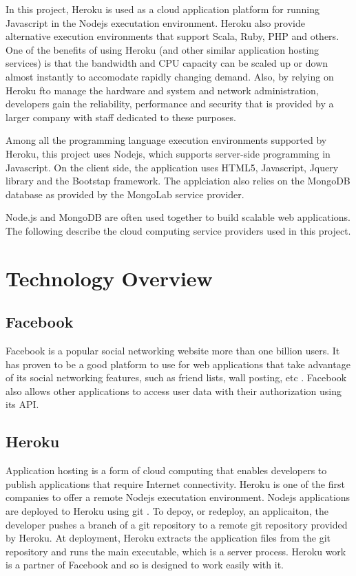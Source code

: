 In this project, Heroku is used as a cloud application platform for running Javascript in the Nodejs executation environment. Heroku also provide alternative execution environments that support Scala, Ruby, PHP and others.  One of the benefits of using Heroku (and other similar application hosting services) is that the bandwidth and CPU capacity can be scaled up or down almost instantly to accomodate rapidly changing demand.  Also, by relying on Heroku fto manage the hardware and system and network administration, developers gain the reliability, performance and security that is provided by a larger company with staff dedicated to these purposes.

Among all the programming language execution environments supported by Heroku, this project uses Nodejs, which supports server-side programming in Javascript. On the client side, the application uses HTML5, Javascript, Jquery library and the Bootstap framework. The applciation also relies on the MongoDB database as provided by the MongoLab service provider.

Node.js and MongoDB are often used together to build scalable web applications. The following describe the cloud computing service providers used in this project.

\section{Technology Overview}

\subsection{Facebook}
Facebook is a popular social networking website more than one billion users. It has proven to be a good platform to use for web applications that take advantage of its social networking features, such as friend lists, wall posting, etc \cite{Facebook}. Facebook also allows other applications to access user data with their authorization using its API. 

\subsection{Heroku}
Application hosting is a form of cloud computing that enables developers to publish applications that require Internet connectivity. Heroku is one of the first companies to offer a remote Nodejs executation environment.  Nodejs applications are deployed to Heroku using git \cite{Heroku}.  To depoy, or redeploy, an applicaiton, the developer pushes a branch of a git repository to a remote git repository provided by Heroku.  At deployment, Heroku extracts the application files from the git repository and runs the main executable, which is a server process.  Heroku work is a partner of Facebook and so is designed to work easily with it. 

